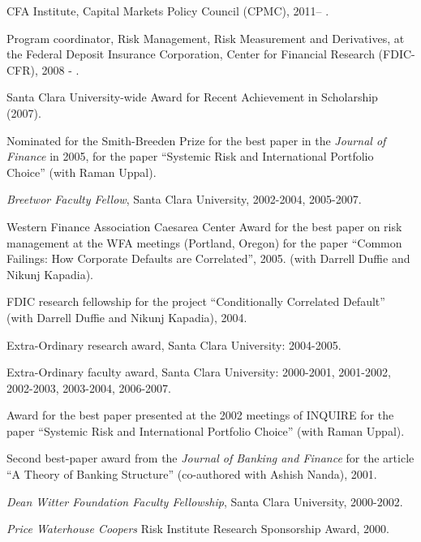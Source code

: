 \documentclass{article}
\begin{document}
\begin{description}
\begin{etaremune}
\item CFA Institute, Capital Markets Policy Council (CPMC), 2011-- .

\item Program coordinator, Risk Management, Risk Measurement and Derivatives, at the Federal Deposit Insurance Corporation, Center for Financial Research (FDIC-CFR), 2008 - .

\item Santa Clara University-wide Award for Recent Achievement in Scholarship (2007). 

\item Nominated for the Smith-Breeden Prize for the best paper in the {\it Journal of Finance} in 2005, for the paper ``Systemic Risk and International Portfolio Choice'' (with Raman Uppal). 

\item {\it Breetwor Faculty Fellow}, Santa Clara University, 2002-2004,
2005-2007.

\item Western Finance Association Caesarea Center Award 
for the best paper on risk management at the WFA meetings
(Portland, Oregon) for the paper ``Common Failings:
How Corporate Defaults are Correlated'', 2005.  (with Darrell
Duffie and Nikunj Kapadia).

\item FDIC research fellowship for the project 
``Conditionally Correlated Default'' (with Darrell
Duffie and Nikunj Kapadia), 2004. 

\item Extra-Ordinary research award, Santa Clara University: 2004-2005.

\item Extra-Ordinary faculty award, Santa Clara University: 2000-2001, 
2001-2002, 2002-2003, 2003-2004, 2006-2007.

\item Award for the best paper presented at the 2002 meetings
of INQUIRE for the paper ``Systemic Risk and International Portfolio
Choice'' (with Raman Uppal). 

\item Second best-paper award from the {\it Journal of Banking and
Finance} for the article ``A Theory of Banking Structure'' (co-authored
with Ashish Nanda), 2001.

\item {\it Dean Witter Foundation Faculty Fellowship}, Santa Clara University,
2000-2002.

\item {\it Price Waterhouse Coopers} Risk Institute Research Sponsorship
Award, 2000.


\end{etaremune}
\end{description}
\end{document}
